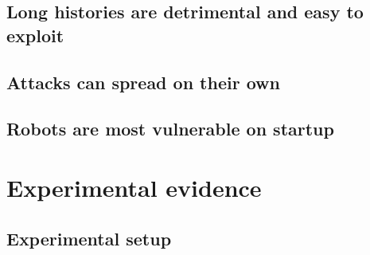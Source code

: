 \subsection{Long histories are detrimental and easy to exploit} %
\subsection{Attacks can spread on their own} %
\subsection{Robots are most vulnerable on startup}

\section{Experimental evidence}
\subsection{Experimental setup}
